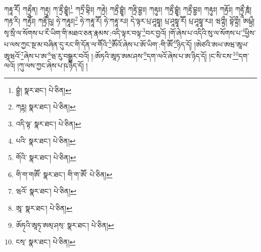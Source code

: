ཀརྟཱ་རཽ། ཀརྟྲཱྀན། ཀརྟྲཱ། ཀ་རྟྲྀ་བྷྱཱཾ།\footnote{བྷྱཾ།  སྣར་ཐང་།  པེ་ཅིན། } ཀཏྲྀ་བྷིཿ། ཀརྟྲེ། ཀརྟྲྀ་བྷྱཱཾ། ཀརྟྲི་བྷྱཿ། ཀརྟུཿ། ཀརྟྲྀ་བྷྱཱཾ། ཀརྟྲྀ་བྷྱཿ། ཀརྟུཿ། ཀརྟྲོཿ། ཀརྟྲཱྀ་ཎཱཾ། ཀརྟ་རི། ཀརྟྲོཿ། ཀརྟྲྀ་ཥུ། ཧེ་ཀརྟཱཿ།\footnote{ཀཪྟ།  སྣར་ཐང་།  པེ་ཅིན། } ཧེ་ཀརྟཱ་རཽ། ཧེ་ཀརྟཱ་རཿ། དེ་ལྟར་པྲ་ཤཱསྟཱ། པྲ་ཤཱསྟཱ་རཽ། པྲ་ཤཱསྟཱ་རཿ། ཝཀྟྲྀ། བྷོཀྟྲྀ། ཨཔྟྲྀ། སྭ་སྲྀ་ལ་སོགས་པ་རྀ་ཡིག་གི་མཐའ་ཅན་རྣམས་:འདི་ལྟར་བལྟ་\footnote{འདི་ལྟ་  སྣར་ཐང་།  པེ་ཅིན། }བར་བྱའོ། །གོ་ཞེས་པ་འདིའི་སུ་ལ་སོགས་པ་\footnote{པའི་  སྣར་ཐང་།  པེ་ཅིན། }ཕྱིས་པ་ལས་ཀྱང་སྔ་མ་བཞིན་དུ་རང་གི་དོན་ལ་གཽའི་\footnote{གོའི་  སྣར་ཐང་།  པེ་ཅིན། }ཨཽའོ་ཞེས་པ་ཨོ་ཡིག་:གི་ཨཽ་\footnote{གི་ག་གཨཽ་  སྣར་ཐང་། གི་ག་ཨཽ་  པེ་ཅིན། }ཉིད་དོ། །ཨེཙའི་ཨཡ་ཨཝ་ཨཱཡ་ཨཱཝའོ་\footnote{ཝའོ་  སྣར་ཐང་།  པེ་ཅིན། }ཞེས་པ་ཨ་\footnote{ཨཱ་  སྣར་ཐང་།  པེ་ཅིན། }ཝ་རུ་བསྒྱུར་བའོ། །:ཨོཏའི་ཨཱཏ་ཨམ་ཤས་\footnote{ཨོཏ྄འི་ཨཱཏ྄་ཨམ྄་ཤས྄་  སྣར་ཐང་།  པེ་ཅིན། }དག་ལའོ་ཞེས་པ་ཨ་ཉིད་དོ། །ང་སི་ངས་\footnote{ངས྄་  སྣར་ཐང་།  པེ་ཅིན། }དག་ལའོ། །ཀུ་ལས་ཀྱང་ཞེས་པ་ཥ་ཉིད་དོ། །
